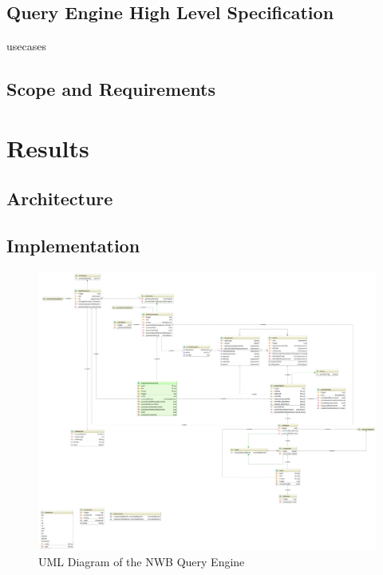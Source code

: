 \documentclass[utf8]{frontiersSCNS} %
\begin{document}
\subsection{Query Engine High Level Specification}
\label{Query_engine_specification}
usecases

\subsection{Scope and Requirements}
\label{Scope_and_requirements}


\section{Results}
\label{results}

\subsection{Architecture}
\label{Architecture}

\subsection{Implementation}
\label{Implementation}

\begin{figure}
  \includegraphics[width=17cm]{diagram}
\caption{UML Diagram of the NWB Query Engine}
\label{fig:diagram}
\end{figure}
\end{document}
